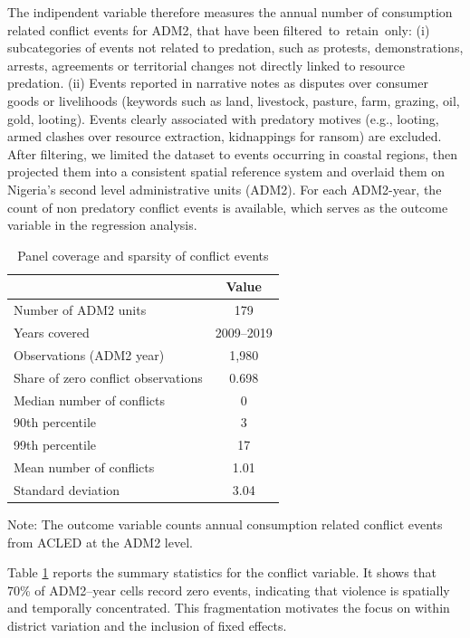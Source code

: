 The indipendent variable therefore measures the annual number of consumption related
conflict events for ADM2, that have been filtered to retain only: (i) subcategories of events not related to predation, such as protests, demonstrations, arrests, agreements or territorial changes not directly linked to resource predation. (ii) Events reported in narrative notes as disputes over consumer goods or livelihoods (keywords such as land, livestock, pasture, farm, grazing, oil, gold, looting).
Events clearly associated with predatory motives (e.g., looting, armed clashes over resource extraction, kidnappings for ransom) are excluded.\\

After filtering, we limited the dataset to events occurring in coastal regions, then projected them into a consistent spatial reference system and overlaid them on Nigeria's second level administrative units (ADM2). For each ADM2-year, the count of non predatory conflict events is available, which serves as the outcome variable in the regression analysis.\\
\begin{table}[htbp]\centering
	\caption{Panel coverage and sparsity of conflict events}
	\label{panel_structure}
	\begin{tabular}{lc}
		\toprule
		& Value \\
		\midrule
		Number of ADM2 units & 179 \\
		Years covered & 2009--2019 \\
		Observations (ADM2 year) & 1,980 \\
		Share of zero conflict observations & 0.698 \\
		Median number of conflicts & 0 \\
		90th percentile & 3 \\
		99th percentile & 17 \\
		Mean number of conflicts & 1.01 \\
		Standard deviation & 3.04 \\
		\bottomrule
	\end{tabular}
	\vspace{3pt}
	\begin{minipage}{0.6\textwidth}
		\footnotesize Note: The outcome variable counts annual consumption related conflict events from ACLED at the ADM2 level. 
	\end{minipage}
\end{table}
Table \ref{panel_structure}  reports the summary statistics for the conflict variable. It shows that 70\% of ADM2–year cells record zero events, indicating that violence is spatially and temporally concentrated. This fragmentation motivates the focus on within district variation and the inclusion of fixed effects. \\

